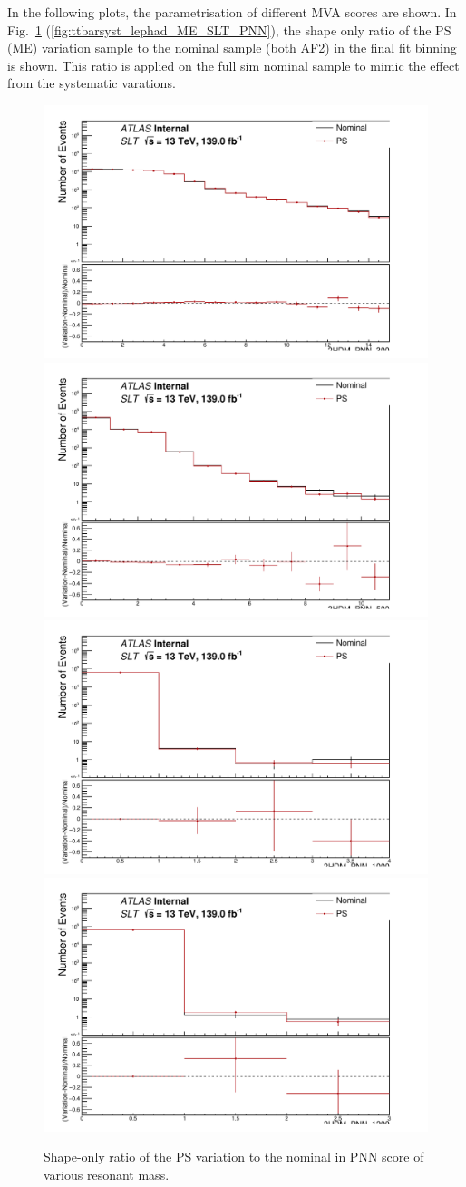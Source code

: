 In the following plots, the parametrisation of different MVA scores are shown. 
In Fig.~\ref{fig:ttbarsyst_lephad_PS_SLT_PNN} (\ref{fig:ttbarsyst_lephad_ME_SLT_PNN}),
the shape only ratio of the PS (ME) variation sample 
to the nominal sample (both AF2) in the final 
fit binning is shown. This ratio is applied on the full sim nominal sample to mimic the 
effect from the systematic varations. 

\begin{figure}
\centering
\includegraphics[width=.41\textwidth]{figures/lephad_modelling_systs/SLT/PS/limit_binning_2HDM_PNN_300_Norm}
\includegraphics[width=.41\textwidth]{figures/lephad_modelling_systs/SLT/PS/limit_binning_2HDM_PNN_500_Norm}\\
\includegraphics[width=.41\textwidth]{figures/lephad_modelling_systs/SLT/PS/limit_binning_2HDM_PNN_1000_Norm}
\includegraphics[width=.41\textwidth]{figures/lephad_modelling_systs/SLT/PS/limit_binning_2HDM_PNN_1200_Norm}
\caption{Shape-only ratio of the PS variation to the nominal in PNN score of various resonant mass.}
\label{fig:ttbarsyst_lephad_PS_SLT_PNN}
\end{figure}


